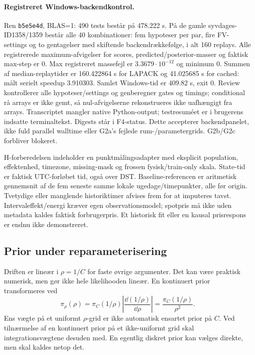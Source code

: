 \paragraph{Registreret Windows-backendkontrol.}
Ren \texttt{b5e5e4d}, BLAS=1: 490 tests består på 478.222 s.
På de gamle syvdages-ID1358/1359 består alle 40 kombinationer:
fem hypoteser per par, fire FV-settings og to gentagelser med skiftende
backendrækkefølge, i alt 160 replays. Alle registrerede maximum-afvigelser
for scores, predicted/posterior-masser og faktisk max-step er 0.
Max registreret massefejl er $3.3679\cdot10^{-12}$ og minimum 0.
Summen af median-replaytider er 160.422864 s for LAPACK og 41.025685 s
for cached: målt serielt speedup 3.910303. Samlet Windows-tid er 409.82 s,
exit 0. Review kontrollerer alle hypoteser/settings og genberegner gates og timings;
conditional rå arrays er ikke gemt, så nul-afvigelserne rekonstrueres ikke
uafhængigt fra arrays. Transcriptet mangler native Python-output;
testresuméet er i brugerens indsatte terminaltekst. Digests står i F4-status.
Dette accepterer backendpanelet, ikke fuld parallel walltime eller G2a's
fejlede rum-/parametergrids. G2b/G2c forbliver blokeret.

H-forberedelsen indeholder en punktmålingsadapter med eksplicit population,
effektenhed, timezone, missing-mask og frossen fysisk/train-only skala.
State-tid er faktisk UTC-forløbet tid, også over DST. Baseline-referencen er
aritmetisk gennemsnit af de fem seneste samme lokale ugedage/timepunkter,
alle før origin. Tvetydige eller manglende historiktimer afvises frem for at
imputeres tavst. Intervaleffekt/energi kræver egen observationsmodel;
spotpris må ikke uden metadata kaldes faktisk forbrugerpris.
Et historisk fit eller en kausal prisrespons er endnu ikke demonstreret.

\subsection{Prior under reparameterisering}

Driften er lineær i \(\rho=1/C\) for faste øvrige argumenter. Det kan være praktisk numerisk, men gør ikke hele likelihooden lineær. En kontinuert prior transformeres ved
\begin{equation}
 \pi_\rho(\rho)=\pi_C(1/\rho)\left|\frac{\dd (1/\rho)}{\dd\rho}\right|
 =\frac{\pi_C(1/\rho)}{\rho^2}.
 \label{eq:priortransform}
\end{equation}
Ens vægte på et uniformt \(\rho\)-grid er ikke automatisk ensartet prior på \(C\). Ved tilnærmelse af en kontinuert prior på et ikke-uniformt grid skal integrationsvægtene desuden med. En egentlig diskret prior kan vælges direkte, men skal kaldes netop det.

